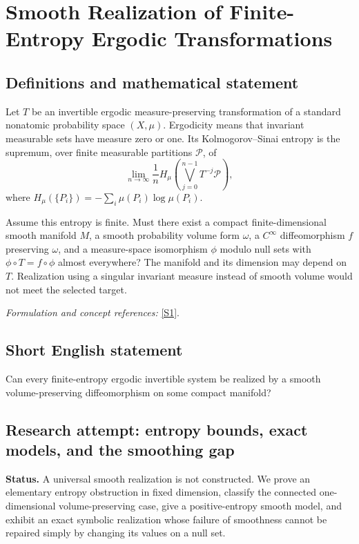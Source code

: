 \documentclass[11pt]{article}
\begin{document}
\section*{\texorpdfstring{Smooth Realization of Finite-Entropy Ergodic Transformations}{Smooth Realization of Finite-Entropy Ergodic Transformations}}\label{statement}
\subsection{Definitions and mathematical statement}
Let $T$ be an invertible ergodic measure-preserving transformation of a standard nonatomic probability space $(X,\mu)$. Ergodicity means that invariant measurable sets have measure zero or one. Its Kolmogorov--Sinai entropy is the supremum, over finite measurable partitions $\mathcal P$, of
\[
 \lim_{n\to\infty}\frac1n
 H_\mu\!\left(\bigvee_{j=0}^{n-1}T^{-j}\mathcal P\right),
\]
where $H_\mu(\{P_i\})=-\sum_i\mu(P_i)\log\mu(P_i)$.

Assume this entropy is finite. Must there exist a compact finite-dimensional smooth manifold $M$, a smooth probability volume form $\omega$, a $C^\infty$ diffeomorphism $f$ preserving $\omega$, and a measure-space isomorphism $\phi$ modulo null sets with $\phi\circ T=f\circ\phi$ almost everywhere? The manifold and its dimension may depend on $T$. Realization using a singular invariant measure instead of smooth volume would not meet the selected target.
\par\smallskip\textit{Formulation and concept references:} \href{https://arxiv.org/html/2203.10655}{[S1]}.

\subsection{Short English statement}
Can every finite-entropy ergodic invertible system be realized by a smooth volume-preserving diffeomorphism on some compact manifold?
\subsection{Research attempt: entropy bounds, exact models, and the smoothing gap}
\textbf{Status.} A universal smooth realization is not constructed. We prove an elementary entropy obstruction in fixed dimension, classify the connected one-dimensional volume-preserving case, give a positive-entropy smooth model, and exhibit an exact symbolic realization whose failure of smoothness cannot be repaired simply by changing its values on a null set.
\end{document}
